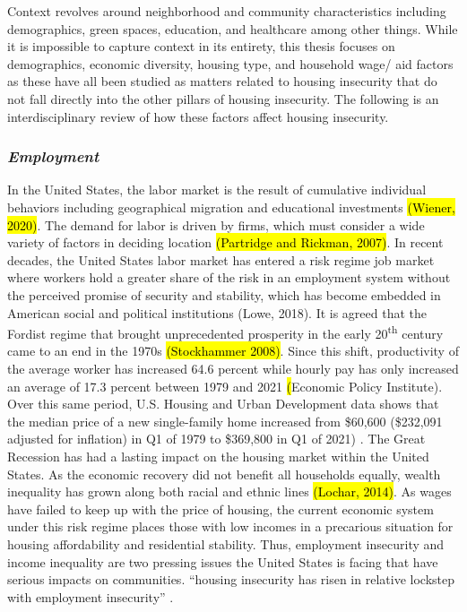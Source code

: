 Context revolves around neighborhood and community characteristics including demographics, green spaces, education, and healthcare among other things. While it is impossible to capture context in its entirety, this thesis focuses on demographics, economic diversity, housing type, and household wage/ aid factors as these have all been studied as matters related to housing insecurity that do not fall directly into the other pillars of housing insecurity. The following is an interdisciplinary review of how these factors affect housing insecurity.  

\subsubsection{\textit{Employment}}

In the United States, the labor market is the result of cumulative individual behaviors including geographical migration and educational investments \hl{(Wiener, 2020)}. The demand for labor is driven by firms, which must consider a wide variety of factors in deciding location \hl{(Partridge and Rickman, 2007)}. In recent decades, the United States labor market has entered a risk regime job market where workers hold a greater share of the risk in an employment system without the perceived promise of security and stability, which has become embedded in American social and political institutions (Lowe, 2018). It is agreed that the Fordist regime that brought unprecedented prosperity in the early 20\textsuperscript{th} century came to an end in the 1970s \hl{(Stockhammer 2008)}. Since this shift, productivity of the average worker has increased 64.6 percent while hourly pay has only increased an average of 17.3 percent between 1979 and 2021 \hl(Economic Policy Institute). Over this same period, U.S. Housing and Urban Development data shows that the median price of a new single-family home increased from \$60,600 (\$232,091 adjusted for inflation) in Q1 of 1979 to \$369,800 in Q1 of 2021) \citep{us_census_bureau_median_1963}. The Great Recession has had a lasting impact on the housing market within the United States. As the economic recovery did not benefit all households equally, wealth inequality has grown along both racial and ethnic lines \hl{(Lochar, 2014)}. As wages have failed to keep up with the price of housing, the current economic system under this risk regime places those with low incomes in a precarious situation for housing affordability and residential stability. Thus, employment insecurity and income inequality are two pressing issues the United States is facing that have serious impacts on communities. “housing insecurity has risen in relative lockstep with employment insecurity” \citep[48]{desmond_housing_2016-1}.  

